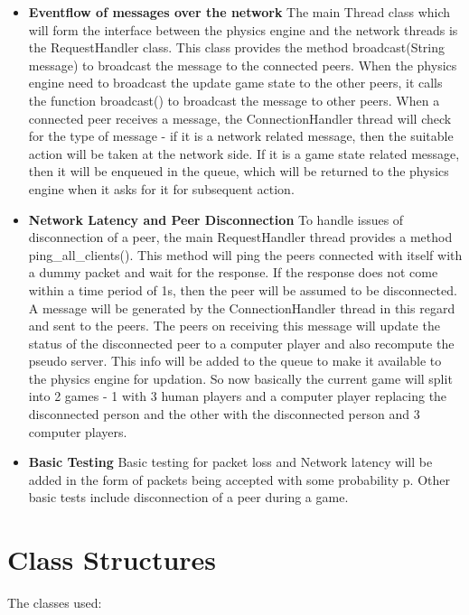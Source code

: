 \documentclass{article}
\begin{document}
\begin{itemize}
    \item  \textbf{Eventflow of messages over the network} The main Thread class which will form the interface between the physics engine and the network threads is the RequestHandler class. This class provides the method broadcast(String message) to broadcast the message to the connected peers. When the physics engine need to broadcast the update game state to the other peers, it calls the function broadcast() to broadcast the message to other peers. When a connected peer receives a message, the ConnectionHandler thread will check for the type of message - if it is a network related message, then the suitable action will be taken at the network side. If it is a game state related message, then it will be enqueued in the queue, which will be returned to the physics engine when it asks for it for subsequent action.

    \item  \textbf{Network Latency and Peer Disconnection} To handle issues of disconnection of a peer, the main RequestHandler thread provides a method ping\_all\_clients(). This method will ping the peers connected with itself with a dummy packet and wait for the response. If the response does not come within a time period of 1s, then the peer will be assumed to be disconnected. A message will be generated by the ConnectionHandler thread in this regard and sent to the peers. The peers on receiving this message will update the status of the disconnected peer to a computer player and also recompute the pseudo server. This info will be added to the queue to make it available to the physics engine for updation. So now basically the current game will split into 2 games - 1 with 3 human players and a computer player replacing the disconnected person and the other with the disconnected person and 3 computer players.
    
    \item \textbf{Basic Testing} Basic testing for packet loss and Network latency will be added in the form of packets being accepted with some probability p. Other basic tests include disconnection of a peer during a game.
    \end{itemize}

\section{Class Structures}

The classes used:
\end{document}
